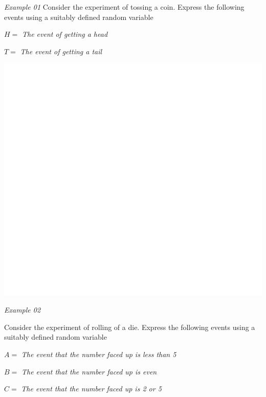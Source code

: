 \documentclass[]{book}
\begin{document}
\emph{Example 01}
Consider the experiment of tossing a coin. Express the following events using a suitably defined random variable

\(H=\) \emph{The event of getting a head}

\(T=\) \emph{The event of getting a tail}

\begin{center}\includegraphics[width=1\linewidth]{figure/Ch1box1-1} \end{center}

\emph{Example 02}

Consider the experiment of rolling of a die. Express the following events using a suitably defined random variable

\(A=\) \emph{The event that the number faced up is less than 5}

\(B=\) \emph{The event that the number faced up is even}

\(C=\) \emph{The event that the number faced up is 2 or 5}
\end{document}
